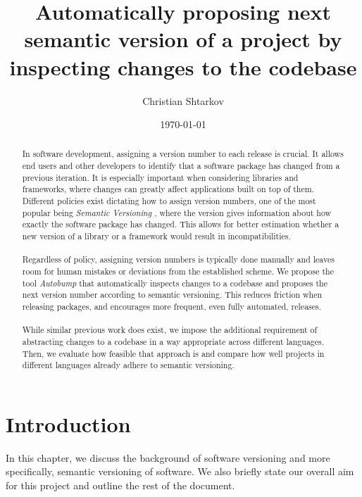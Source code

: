 \documentclass{l4proj}
\begin{document}
\title{Automatically proposing next semantic version of a project by \\
inspecting changes to the codebase}
\author{Christian Shtarkov}
\date{\today}
\maketitle

\begin{abstract}
In software development, assigning a version number
to each release is crucial. It allows end users and other developers
to identify that a software package has changed from a previous
iteration. It is especially important when considering libraries and
frameworks, where changes can greatly affect applications built on top
of them. \\ Different policies exist dictating how to assign version
numbers, one of the most popular being \textit{Semantic
Versioning} \cite{SemanticVersioning}, where the version gives
information about how exactly the software package has changed. This
allows for better estimation whether a new version of a library or a
framework would result in incompatibilities.
\\\\
Regardless of
policy, assigning version numbers is typically done manually and
leaves room for human mistakes or deviations from the established
scheme. We propose the tool \textit{Autobump} that automatically
inspects changes to a codebase and proposes the next version number
according to semantic versioning. This reduces friction when releasing
packages, and encourages more frequent, even fully automated,
releases.
\\\\
While similar previous work does exist, we impose the additional
requirement of abstracting changes to a codebase in a way appropriate
across different languages. Then, we evaluate how feasible that
approach is and compare how well projects in different languages
already adhere to semantic versioning.
\end{abstract}

\educationalconsent

\tableofcontents

\chapter{Introduction}

In this chapter, we discuss the background of software versioning and
more specifically, semantic versioning of software. We also briefly
state our overall aim for this project and outline the rest of the
document.
\end{document}
